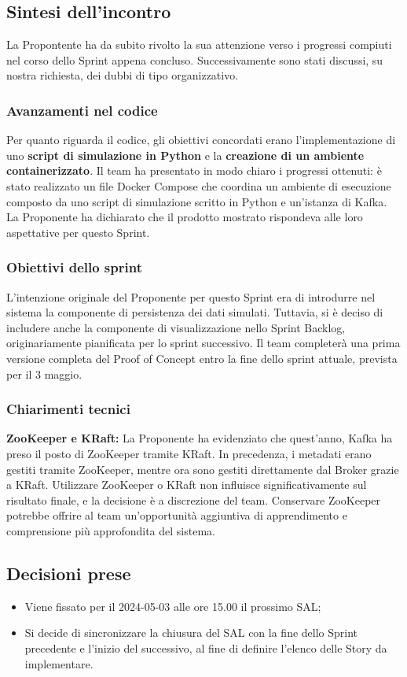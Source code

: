 \documentclass[8pt]{article}
\begin{document}
\subsection{Sintesi dell'incontro}
La Propontente ha da subito rivolto la sua attenzione verso i progressi compiuti nel corso dello Sprint appena concluso. Successivamente sono stati discussi, su nostra richiesta, dei dubbi di tipo organizzativo.
\subsubsection{Avanzamenti nel codice}
Per quanto riguarda il codice, gli obiettivi concordati erano l'implementazione di uno \textbf{script di simulazione in Python} e la \textbf{creazione di un ambiente containerizzato}. Il team ha presentato in modo chiaro i progressi ottenuti: è stato realizzato un file Docker Compose che coordina un ambiente di esecuzione composto da uno script di simulazione scritto in Python e un'istanza di Kafka. La Proponente ha dichiarato che il prodotto mostrato rispondeva alle loro aspettative per questo Sprint.
\subsubsection{Obiettivi dello sprint}
L'intenzione originale del Proponente per questo Sprint era di introdurre nel sistema la componente di persistenza dei dati simulati. Tuttavia, si è deciso di includere anche la componente di visualizzazione nello Sprint Backlog, originariamente pianificata per lo sprint successivo. Il team completerà una prima versione completa del Proof of Concept entro la fine dello sprint attuale, prevista per il 3 maggio. 
\subsubsection{Chiarimenti tecnici}
\textbf{ZooKeeper e KRaft:} La Proponente ha evidenziato che quest'anno, Kafka ha preso il posto di ZooKeeper tramite KRaft. In precedenza, i metadati erano gestiti tramite ZooKeeper, mentre ora sono gestiti direttamente dal Broker grazie a KRaft. Utilizzare ZooKeeper o KRaft non influisce significativamente sul risultato finale, e la decisione è a discrezione del team. Conservare ZooKeeper potrebbe offrire al team un'opportunità aggiuntiva di apprendimento e comprensione più approfondita del sistema.

\subsection{Decisioni prese}
\begin{itemize}
	\setlength\itemsep{0em}
	\item Viene fissato per il 2024-05-03 alle ore 15.00 il prossimo SAL;
	\item Si decide di sincronizzare la chiusura del SAL con la fine dello Sprint precedente e l'inizio del successivo, al fine di definire l'elenco delle Story da implementare.
\end{itemize}
\end{document}
